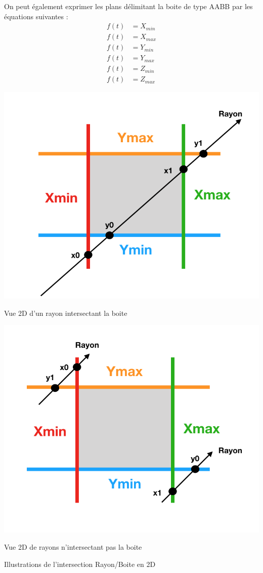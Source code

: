On peut également exprimer les plans délimitant la boite de type \gls{AABB} par les équations suivantes :
\begin{align*}
f(t) &= X_{min}  \\
f(t) &= X_{max}  \\
f(t) &= Y_{min}  \\
f(t) &= Y_{max} \\
f(t) &= Z_{min} \\
f(t) &= Z_{max}
\end{align*}


\begin{figureth}
	\begin{subfigureth}{0.45\textwidth}
		\includegraphics[width=\linewidth]{images/AABB}
		\caption{Vue 2D d'un rayon intersectant la boite}
		\label{AABB}
	\end{subfigureth}
	\qquad
	\begin{subfigureth}{0.45\textwidth}
		\includegraphics[width=\linewidth]{images/AABB2}
		\caption{Vue 2D de rayons n'intersectant pas la boite}
		\label{AABB2}
	\end{subfigureth}
	\caption{Illustrations de l'intersection Rayon/Boite en 2D}
\end{figureth}

